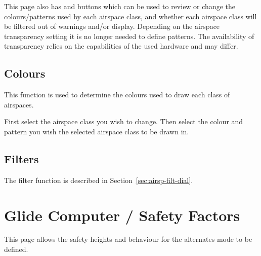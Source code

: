 This page also has  and  buttons which
can be used to review or change the colours/patterns used by each
airspace class, and whether each airspace class will be filtered out
of warnings and/or display. Depending on the airspace transparency setting it is 
no longer needed to define patterns. The availability of transparency relies 
on the capabilities of the used hardware and may differ. 

\subsection*{Colours}
This function is used to determine the colours used to draw each class of
airspaces.

First select the airspace class you wish to change. Then select the colour and 
pattern you wish the selected airspace class to be drawn in.

\subsection*{Filters}
The filter function is described in Section~\ref{sec:airsp-filt-dial}.


\section{Glide Computer / Safety Factors}

This page allows the safety heights and behaviour for the alternates mode to be defined.

